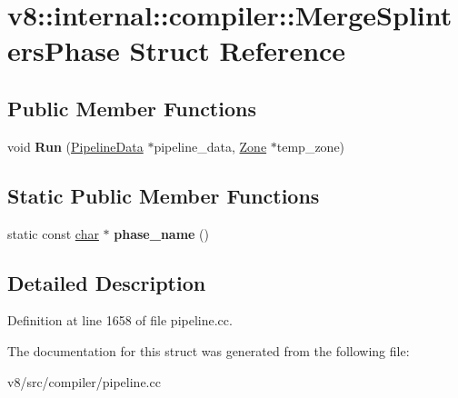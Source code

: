 \hypertarget{structv8_1_1internal_1_1compiler_1_1MergeSplintersPhase}{}\section{v8\+:\+:internal\+:\+:compiler\+:\+:Merge\+Splinters\+Phase Struct Reference}
\label{structv8_1_1internal_1_1compiler_1_1MergeSplintersPhase}
\subsection*{Public Member Functions}
\begin{DoxyCompactItemize}
\item 
\mbox{\label{structv8_1_1internal_1_1compiler_1_1MergeSplintersPhase_a6b4dc9ed3507fb0e8a992c2e8ad382ca}} 
void {\bfseries Run} (\mbox{\hyperlink{classv8_1_1internal_1_1compiler_1_1PipelineData}{Pipeline\+Data}} $\ast$pipeline\+\_\+data, \mbox{\hyperlink{classv8_1_1internal_1_1Zone}{Zone}} $\ast$temp\+\_\+zone)
\end{DoxyCompactItemize}
\subsection*{Static Public Member Functions}
\begin{DoxyCompactItemize}
\item 
\mbox{\label{structv8_1_1internal_1_1compiler_1_1MergeSplintersPhase_a33f85cf690fb1735dc8caa2ad49dccd1}} 
static const \mbox{\hyperlink{classchar}{char}} $\ast$ {\bfseries phase\+\_\+name} ()
\end{DoxyCompactItemize}


\subsection{Detailed Description}


Definition at line 1658 of file pipeline.\+cc.



The documentation for this struct was generated from the following file\+:\begin{DoxyCompactItemize}
\item 
v8/src/compiler/pipeline.\+cc\end{DoxyCompactItemize}
